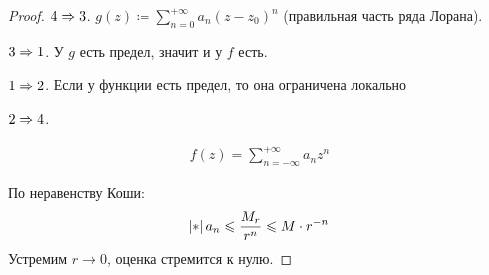 \begin{proof}
    $4 \Rightarrow 3$.
    $g(z) \coloneqq \sum\limits_{n=0}^{+\infty} a_n(z-z_0)^n$ (правильная
    часть ряда Лорана).

    $3 \Rightarrow 1$. У $g$ есть предел, значит и у $f$ есть.

    $1 \Rightarrow 2$. Если у функции есть предел, то она ограничена локально

    $2 \Rightarrow 4$.

    \begin{gather*}
        f(z) = \sum\limits_{n=-\infty}^{+\infty} a_nz^n
    \end{gather*}

    По неравенству Коши: 
    \begin{gather*}
        \abs{a_n} \le \frac{M_r}{r^n} \le M \cdot r^{-n}
    \end{gather*}
    Устремим $r \to 0$, оценка стремится к нулю.
\end{proof}

\newpage

